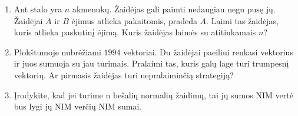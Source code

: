 \begin{enumerate}
\item Ant stalo yra $n$ akmenukų. Žaidėjas gali paimti nedaugiau negu pusę
  jų. Žaidėjai $A$ ir $B$ ėjimus atlieka pakaitomis, pradeda $A$.  Laimi
  tas žaidėjas, kuris atlieka paskutinį ėjimą. Kuris žaidėjas laimės su
  atitinkamais $n$?


\item Plokštumoje nubrėžiami $1994$ vektoriai. Du žaidėjai paeiliui renkasi
  vektorius ir juos sumuoja su jau turimais. Pralaimi tas, kuris galų lage
  turi trumpesnį vektorių. Ar pirmasis žaidėjas turi nepralaiminčią
  strategiją?



\item Įrodykite, kad jei turime n bešalių normalių žaidimų, tai jų sumos NIM vertė bus lygi jų NIM verčių NIM sumai. 



\end{enumerate}
